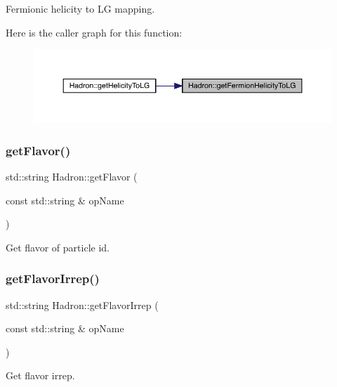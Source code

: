 Fermionic helicity to LG mapping. 

Here is the caller graph for this function\+:
\nopagebreak
\begin{figure}[H]
\begin{center}
\leavevmode
\includegraphics[width=350pt]{d1/daf/namespaceHadron_af7b75d50b2ca47d90a4d42ff7152bf4d_icgraph}
\end{center}
\end{figure}
\mbox{\label{namespaceHadron_adfbec5b7f783df2c9cefec3692adf179}} 
\subsubsection{\texorpdfstring{getFlavor()}{getFlavor()}}
{\footnotesize\ttfamily std\+::string Hadron\+::get\+Flavor (\begin{DoxyParamCaption}\item[{const std\+::string \&}]{op\+Name }\end{DoxyParamCaption})}



Get flavor of particle id. 

\mbox{\label{namespaceHadron_ad5a318554ed24d3e28841abd57345adf}} 
\subsubsection{\texorpdfstring{getFlavorIrrep()}{getFlavorIrrep()}}
{\footnotesize\ttfamily std\+::string Hadron\+::get\+Flavor\+Irrep (\begin{DoxyParamCaption}\item[{const std\+::string \&}]{op\+Name }\end{DoxyParamCaption})}



Get flavor irrep. 

\mbox{\label{namespaceHadron_aeab17d669da3fa4a904236091bd5384f}} 
